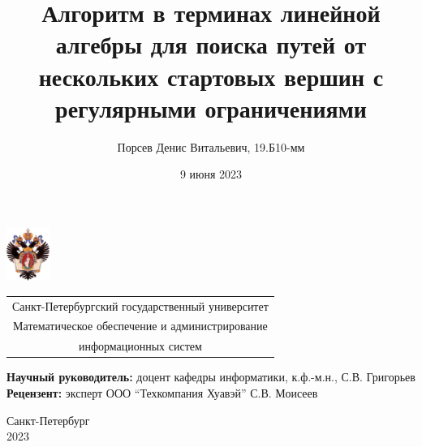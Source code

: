 \documentclass{beamer}
\title[BFS-based RPQ]{Алгоритм в терминах линейной алгебры для поиска путей от нескольких стартовых вершин с регулярными ограничениями}
\institute[СПбГУ]{}
\author[Денис Порсев]{Порсев Денис Витальевич, 19.Б10-мм}
\date{9 июня 2023}
\begin{document}
{
\begin{frame}
  \includegraphics[width=1.4cm]{pictures/SPbGU_Logo.png}
  \vspace{-45pt}
  \hspace{-10pt}
  \begin{center}
    \begin{tabular}{c}
      \scriptsize{Санкт-Петербургский государственный университет} \\
      \scriptsize{Математическое обеспечение и администрирование}  \\ \scriptsize{информационных систем}
    \end{tabular}
    \titlepage
  \end{center}

  \btVFill

  {\scriptsize
    \textbf{Научный руководитель:} доцент кафедры информатики, к.ф.-м.н., С.В. Григорьев\\
    \textbf{Рецензент:} эксперт ООО “Техкомпания Хуавэй” С.В. Моисеев
  }
  \begin{center}
    \vspace{5pt}
    \scriptsize{Санкт-Петербург\\
      2023}
  \end{center}

\end{frame}
}
\end{document}
